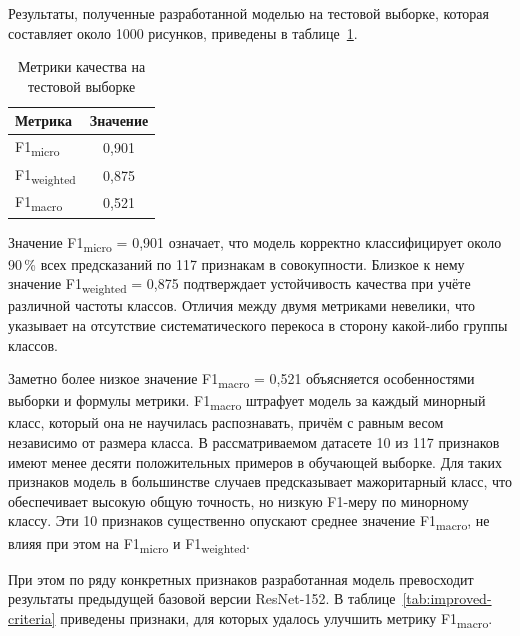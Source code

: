 Результаты, полученные разработанной моделью на тестовой выборке, которая составляет около 1000 рисунков, приведены в таблице~\ref{main-results}.

\begin{table}
    \caption{Метрики качества на тестовой выборке}
    \fontsize{12pt}{18pt}\selectfont
    \begin{tabular}{|l|c|}\hline
        \textbf{Метрика}                      & \textbf{Значение}  \\ \hline
        F1\textsubscript{micro}               & 0,901              \\ \hline
        F1\textsubscript{weighted}            & 0,875              \\ \hline
        F1\textsubscript{macro}               & 0,521              \\ \hline
    \end{tabular}
    \label{main-results}
\end{table}

Значение F1\textsubscript{micro} = 0,901 означает, что модель корректно классифицирует около 90\,\% всех предсказаний по 117 признакам в совокупности. Близкое к нему значение F1\textsubscript{weighted} = 0,875 подтверждает устойчивость качества при учёте различной частоты классов. Отличия между двумя метриками невелики, что указывает на отсутствие систематического перекоса в сторону какой-либо группы классов.

Заметно более низкое значение F1\textsubscript{macro} = 0,521 объясняется особенностями выборки и формулы метрики. F1\textsubscript{macro} штрафует модель за каждый минорный класс, который она не научилась распознавать, причём с равным весом независимо от размера класса. В рассматриваемом датасете 10 из 117 признаков имеют менее десяти положительных примеров в обучающей выборке. Для таких признаков модель в большинстве случаев предсказывает мажоритарный класс, что обеспечивает высокую общую точность, но низкую F1-меру по минорному классу. Эти 10 признаков существенно опускают среднее значение F1\textsubscript{macro}, не влияя при этом на F1\textsubscript{micro} и F1\textsubscript{weighted}.

При этом по ряду конкретных признаков разработанная модель превосходит результаты предыдущей базовой версии ResNet-152. В таблице~\ref{tab:improved-criteria} приведены признаки, для которых удалось улучшить метрику F1\textsubscript{macro}.

